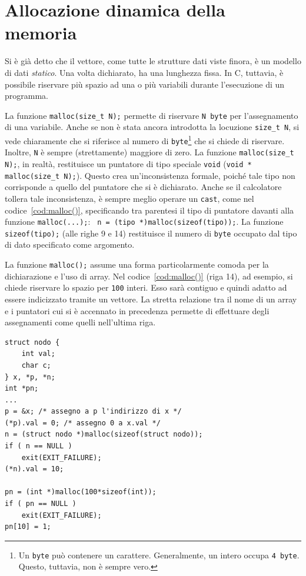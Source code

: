 	\section{Allocazione dinamica della memoria}
	\label{sec:malloc()}
Si è già detto che il vettore, come tutte le strutture dati viste finora, è un modello di dati \emph{statico}. Una volta dichiarato, ha una lunghezza fissa. In C, tuttavia, è possibile riservare più spazio ad una o più variabili durante l'esecuzione di un programma.

La funzione \lstinline!malloc(size_t N);! permette di riservare \lstinline!N byte!  per l'assegnamento di una variabile. Anche se non è stata ancora introdotta la locuzione \lstinline!size_t N!, si vede chiaramente che si riferisce al numero di \lstinline!byte!\footnote{Un \lstinline!byte! può contenere un carattere. Generalmente, un intero occupa \lstinline!4 byte!. Questo, tuttavia, non è sempre vero.} che si chiede di riservare. Inoltre, \lstinline!N! è sempre (strettamente) maggiore di zero. La funzione \lstinline!malloc(size_t N);!, in realtà, restituisce un puntatore di tipo speciale \lstinline!void! (\lstinline!void * malloc(size_t N);!). Questo crea un'inconsistenza formale, poiché tale tipo non corrisponde a quello del puntatore che si è dichiarato. Anche se il calcolatore tollera tale inconsistenza, è sempre meglio operare un \lstinline!cast!, come nel codice~\vref{cod:malloc()}, specificando tra parentesi il tipo di puntatore davanti alla funzione \lstinline!malloc(...);!: \lstinline! n = (tipo *)malloc(sizeof(tipo));!. La funzione \lstinline!sizeof(tipo);! (alle righe 9 e 14) restituisce il numero di \lstinline!byte! occupato dal tipo di dato specificato come argomento.

La funzione \lstinline!malloc();! assume una forma particolarmente comoda per la dichiarazione e l'uso di array. Nel codice~\vref{cod:malloc()} (riga 14), ad esempio, si chiede riservare lo spazio per \lstinline!100! interi. Esso sarà contiguo e quindi adatto ad essere indicizzato tramite un vettore. La stretta relazione tra il nome di un array e i puntatori cui si è accennato in precedenza permette di effettuare degli assegnamenti come quelli nell'ultima riga.
\begin{lstlisting}[caption={[\em Uso della funzione \lstinline!malloc();!.]{\em Uso della funzione \lstinline!malloc();!. Si  faccia particolare attenzione a non dimenticare d'inserire la scelta immediatamente dopo aver richiamato tale funzione.}}, label={cod:malloc()}]
struct nodo {
	int val;
	char c;
} x, *p, *n;
int *pn;
...
p = &x; /* assegno a p l'indirizzo di x */
(*p).val = 0; /* assegno 0 a x.val */
n = (struct nodo *)malloc(sizeof(struct nodo));
if ( n == NULL )
	exit(EXIT_FAILURE);
(*n).val = 10;

pn = (int *)malloc(100*sizeof(int));
if ( pn == NULL )
	exit(EXIT_FAILURE);
pn[10] = 1;
\end{lstlisting}

